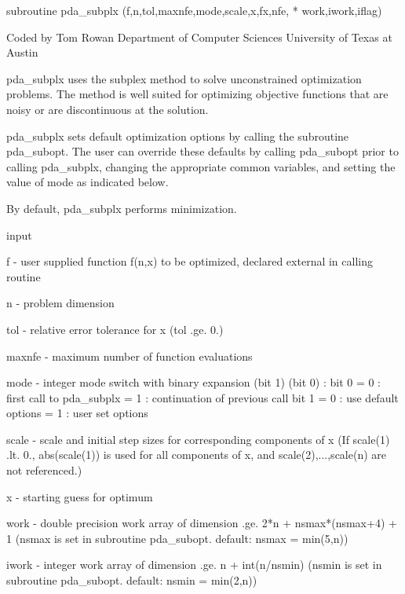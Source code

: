 \documentclass[11pt,twoside,nolof]{starlink}
\begin{document}
\begin{terminalv}
      subroutine pda_subplx (f,n,tol,maxnfe,mode,scale,x,fx,nfe,
     *                   work,iwork,iflag)



                                         Coded by Tom Rowan
                            Department of Computer Sciences
                              University of Texas at Austin

 pda_subplx uses the subplex method to solve unconstrained
 optimization problems.  The method is well suited for
 optimizing objective functions that are noisy or are
 discontinuous at the solution.

 pda_subplx sets default optimization options by calling the
 subroutine pda_subopt.  The user can override these defaults
 by calling pda_subopt prior to calling pda_subplx, changing the
 appropriate common variables, and setting the value of
 mode as indicated below.

 By default, pda_subplx performs minimization.

 input

   f      - user supplied function f(n,x) to be optimized,
            declared external in calling routine

   n      - problem dimension

   tol    - relative error tolerance for x (tol .ge. 0.)

   maxnfe - maximum number of function evaluations

   mode   - integer mode switch with binary expansion
            (bit 1) (bit 0) :
            bit 0 = 0 : first call to pda_subplx
                  = 1 : continuation of previous call
            bit 1 = 0 : use default options
                  = 1 : user set options

   scale  - scale and initial step sizes for corresponding
            components of x
            (If scale(1) .lt. 0.,
            abs(scale(1)) is used for all components of x,
            and scale(2),...,scale(n) are not referenced.)

   x      - starting guess for optimum

   work   - double precision work array of dimension .ge.
            2*n + nsmax*(nsmax+4) + 1
            (nsmax is set in subroutine pda_subopt.
            default: nsmax = min(5,n))

   iwork  - integer work array of dimension .ge.
            n + int(n/nsmin)
            (nsmin is set in subroutine pda_subopt.
            default: nsmin = min(2,n))


\end{terminalv}
\end{document}
